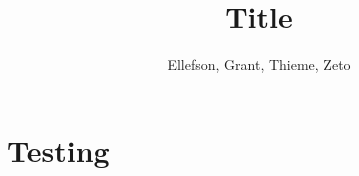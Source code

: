 \documentclass{article}
\begin{document}
\title{Title}
\author{Ellefson, Grant, Thieme, Zeto}
\maketitle

\section{Testing}
\end{document}
